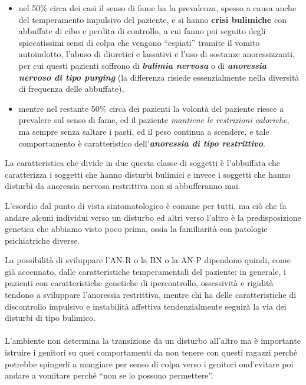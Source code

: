 \begin{itemize}
\item
  nel 50\% circa dei casi il senso di fame ha la prevalenza, spesso a
  causa anche del temperamento impulsivo del paziente, e si hanno
  \textbf{crisi bulimiche} con abbuffate di cibo e perdita di controllo,
  a cui fanno poi seguito degli spiccatissimi sensi di colpa che vengono
  ``espiati'' tramite il vomito autoindotto, l'abuso di diuretici e
  lassativi e l'uso di sostanze anoressizzanti, per cui questi pazienti
  soffrono di \textbf{\emph{bulimia nervosa}} o di
  \textbf{\emph{anoressia nervoso di tipo purging}} (la differenza
  risiede essenzialmente nella diversità di frequenza delle abbuffate),
\item
  mentre nel restante 50\% circa dei pazienti la volontà del paziente
  riesce a prevalere sul senso di fame, ed il paziente \emph{mantiene le
  restrizioni caloriche}, ma sempre senza saltare i pasti, ed il peso
  continua a scendere, e tale comportamento è caratteristico
  dell'\textbf{\emph{anoressia di tipo restrittivo}}.
\end{itemize}

La caratteristica che divide in due questa classe di soggetti è
l'abbuffata che caratterizza i soggetti che hanno disturbi bulimici e
invece i soggetti che hanno disturbi da anoressia nervosa restrittiva
non si abbufferanno mai.

L'esordio dal punto di vista sintomatologico è comune per tutti, ma ciò
che fa andare alcuni individui verso un disturbo ed altri verso l'altro
è la predisposizione genetica che abbiamo visto poco prima, ossia la
familiarità con patologie psichiatriche diverse.

La possibilità di sviluppare l'AN-R o la BN o la AN-P dipendono quindi,
come già accennato, dalle caratteristiche temperamentali del paziente:
in generale, i pazienti con caratteristiche genetiche di ipercontrollo,
ossessività e rigidità tendono a sviluppare l'anoressia restrittiva,
mentre chi ha delle caratteristiche di discontrollo impulsivo e
instabilità affettiva tendenzialmente seguirà la via dei disturbi di
tipo bulimico.
\\\\
L'ambiente non determina la transizione da un disturbo all'altro ma è
importante istruire i genitori su quei comportamenti da non tenere con
questi ragazzi perché potrebbe spingerli a mangiare per senso di colpa
verso i genitori ond'evitare poi andare a vomitare perché ``non se lo
possono permettere''.

